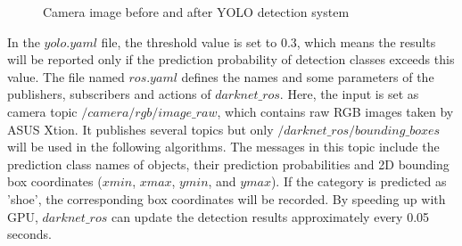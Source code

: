 \begin{figure}[H]
\centering
{}
\caption{Camera image before and after YOLO detection system}
\label{5.2}
\end{figure}

In the $yolo.yaml$ file, the threshold value is set to 0.3, which means the results will be reported only if the prediction probability of detection classes exceeds this value. The file named $ros.yaml$ defines the names and some parameters of the publishers, subscribers and actions of $darknet\_ros$. Here, the input is set as camera topic $/camera/rgb/image\_raw$, which contains raw RGB images taken by ASUS Xtion. It publishes several topics but only $/darknet\_ros/bounding\_boxes$ will be used in the following algorithms. The messages in this topic include the prediction class names of objects, their prediction probabilities and 2D bounding box coordinates ($xmin$, $xmax$, $ymin$, and $ymax$). If the category is predicted as 'shoe', the corresponding box coordinates will be recorded. By speeding up with GPU, $darknet\_ros$ can update the detection results approximately every 0.05 seconds.

